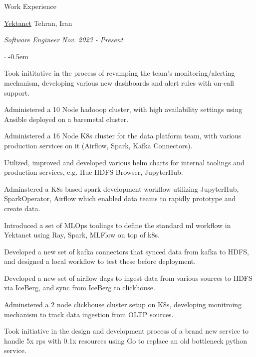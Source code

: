 \documentclass[../professional-cv.tex]{subfiles}
\begin{document}
\begin{rSection}{Work Experience}
	\begin{rWorkSection}
		{\href{https://yektanet.com/}{Yektanet}}
		{Tehran, Iran}

		\vspace{-1em}
		{\em Software Engineer} \hfill {\em Nov. 2023 - Present} \hspace{10pt}
		\normalfont
		\begin{list}{$\cdot$}{\leftmargin=10pt\normalfont \rightmargin=20pt}
			\itemsep -0.5em
			\item Took inititative in the process of revamping the team's monitoring/alerting mechanism, developing various new dashboards and alert rules with on-call support.
			\item Administered a 10 Node hadooop cluster, with high availability settings using Ansible deployed on a baremetal cluster.
			\item Administered a 16 Node K8s cluster for the data platform team, with various production services on it (Airflow, Spark, Kafka Connectors).
			\item Utilized, improved and developed various helm charts for internal toolings and production services, e.g. Hue HDFS Browser, JupyterHub.
			\item Adminstered a K8s based spark development workflow utilizing JupyterHub, SparkOperator, Airflow which enabled data teams to rapidly prototype and create data.
			\item Introduced a set of MLOps toolings to define the standard ml workflow in Yektanet using Ray, Spark, MLFlow on top of k8s.
			\item Developed a new set of kafka connectors that synced data from kafka to HDFS, and designed a local workflow to test these before deployment.
			\item Developed a new set of airflow dags to ingest data from various sources to HDFS via IceBerg, and sync from IceBerg to clickhouse.
			\item Adminstered a 2 node clickhouse cluster setup on K8s, developing monitroing mechanism to track data ingestion from OLTP sources.
			\item Took initiative in the design and development process of a brand new service to handle 5x rps with 0.1x resources using Go to replace an old bottleneck python service.
		\end{list}
	\end{rWorkSection}


\end{rSection}
\end{document}
